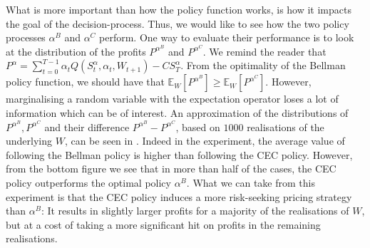 \documentclass[main.tex]{subfiles}
\begin{document}
What is more important than how the policy function works, is how it
impacts the goal of the decision-process. Thus, we would like to see
how the two policy processes $\alpha^B$ and $\alpha^C$ perform.
One way to evaluate their performance is to look at
the distribution of the profits $P^{\alpha^B}$ and $P^{\alpha^C}$.
We remind the reader that
$P^\alpha =
\sum_{t=0}^{T-1}\alpha_tQ(S_t^\alpha,\alpha_t,W_{t+1})-CS_T^\alpha$.
From the opitimality of the Bellman policy function, we should have
that $\mathbb E_W[P^{\alpha^B}]\geq \mathbb E_W[P^{\alpha^C}]$.
However, marginalising a random variable with the expectation operator
loses a lot of information which can be of interest.
An approximation of the distributions of $P^{\alpha^B}, P^{\alpha^C}$
and their difference
$P^{\alpha^B}-P^{\alpha^C}$, based on $1000$ realisations of the
underlying $W$, can be seen in .
Indeed in the experiment, the average value of following the
Bellman policy is higher than following the CEC policy.
However, from the bottom figure we see that
in more than half of the cases, the CEC policy outperforms the optimal
policy $\alpha^B$. What we can take from this experiment is that
the CEC policy induces a more risk-seeking pricing strategy than
$\alpha^B$: It results in slightly larger profits for a majority of the
realisations of $W$, but at a cost of taking a more significant hit on
profits in the remaining realisations.
\end{document}

